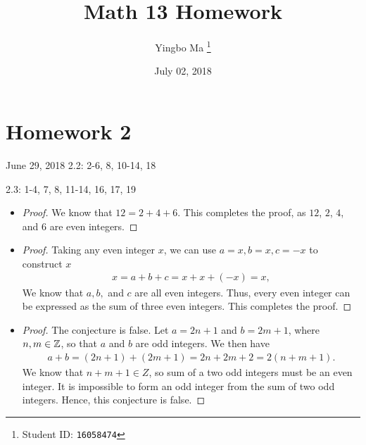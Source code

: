 \documentclass[8pt,twocolumn]{article}
\author{Yingbo Ma \thanks{Student ID: \tt{16058474}}}
\title{\vspace{-1.cm}Math 13 Homework}
\date{July 02, 2018}
\begin{document}
\maketitle
\section*{Homework 2}
June 29, 2018
2.2: 2-6, 8, 10-14, 18

2.3: 1-4, 7, 8, 11-14, 16, 17, 19

\begin{Answer}[number=2.2.2]
  \begin{itemize}
    \item
      \begin{proof}
        We know that $12 = 2+4+6$. This completes the proof, as $12$, $2$, $4$,
        and $6$ are even integers.
      \end{proof}
    \item
      \begin{proof}
        Taking any even integer $x$, we can use $a = x, b = x, c = -x$ to construct
        $x$
        \begin{align*}
          x = a + b + c = x + x + (-x) = x,
        \end{align*}
        We know that $a, b,$ and $c$ are all even integers. Thus, every even
        integer can be expressed as the sum of three even integers. This
        completes the proof.
      \end{proof}
    \item
      \begin{proof}
        The conjecture is false. Let $a=2n+1$ and $b=2m+1$, where $n,m\in
        \mathbb{Z}$, so that $a$ and $b$ are odd integers. We then have
        \begin{align*}
          a+b = (2n + 1) + (2m + 1) = 2n + 2m + 2 = 2(n+m+1).
        \end{align*}
        We know that $n+m+1\in Z$, so sum of a two odd integers must be an even
        integer. It is impossible to form an odd integer from the sum of two
        odd integers. Hence, this conjecture is false.
      \end{proof}

\end{itemize}
\end{Answer}
\end{document}
